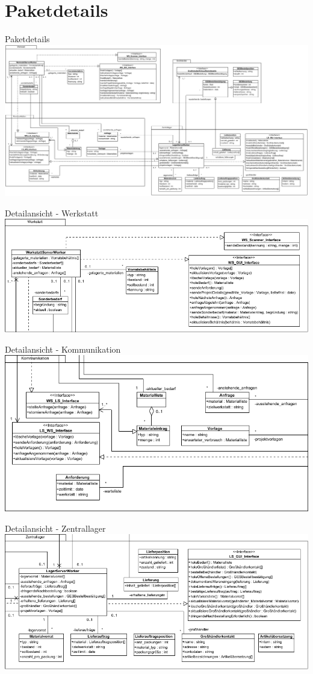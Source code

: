 \documentclass{beamer}
\begin{document}
	\section{Paketdetails}
	\begin{frame}{Paketdetails}
		\includegraphics[width=\textwidth]{PDF/Paketdetails.pdf}
	\end{frame}
\begin{frame}{Detailansicht - Werkstatt}
\includegraphics[width=\textwidth]{PDF/Werkstatt_Paket.pdf}
\end{frame}
\begin{frame}{Detailansicht - Kommunikation}
\includegraphics[width=\textwidth]{PDF/Kommunikation_Paket.pdf}
\end{frame}
\begin{frame}{Detailansicht - Zentrallager}
\includegraphics[width=\textwidth]{PDF/Zentrallager_Paket.pdf}
\end{frame}
\end{document}
